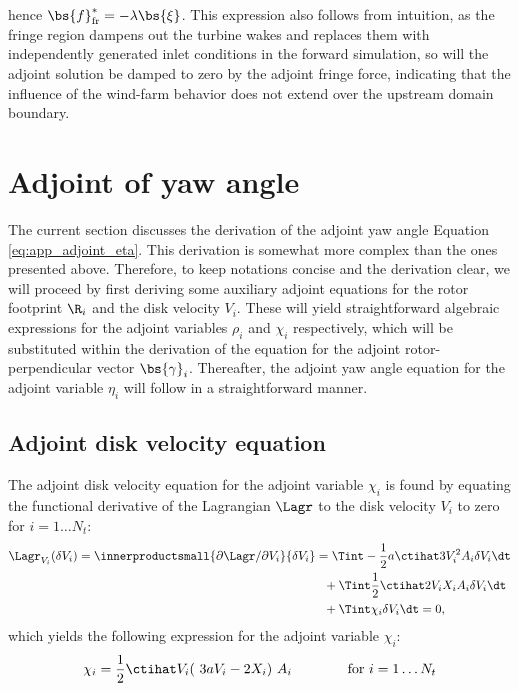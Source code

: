 hence $\bs{f}_{\text{fr}}^* = -\lambda \bs{\xi}$. This expression also follows from intuition, as the fringe region dampens out the turbine wakes and replaces them with independently generated inlet conditions in the forward simulation, so will the adjoint solution be damped to zero by the adjoint fringe force, indicating that the influence of the wind-farm behavior does not extend over the upstream domain boundary. 

\section{Adjoint of yaw angle}
The current section discusses the derivation of the adjoint yaw angle Equation \eqref{eq:app_adjoint_eta}. This derivation is somewhat more complex than the ones presented above. Therefore, to keep notations concise and the derivation clear, we will proceed by first deriving some auxiliary adjoint equations for the rotor footprint $\R_i$ and the disk velocity $V_i$. These will yield straightforward algebraic expressions for the adjoint variables $\rho_i$ and $\chi_i$ respectively, which will be substituted within the derivation of the equation for the adjoint rotor-perpendicular vector $\bs{\gamma}_i$. Thereafter, the adjoint yaw angle equation for the adjoint variable $\eta_i$ will follow in a straightforward manner.



\subsection{Adjoint disk velocity equation}
The adjoint disk velocity equation for the adjoint variable $\chi_i$ is found by equating the functional derivative of the Lagrangian $\Lagr$ to the disk velocity $V_i$ to zero for $i = 1 \dots N_t$: 
\begin{align}
\Lagr_{V_i}(\delta V_i) = \innerproductsmall{\partial \Lagr / \partial V_i}{\delta V_i} &= \Tint -\frac{1}{2} a \ctihat 3 V_i^2 A_i \delta V_i \dt  \nonumber \\
& \ \ + \Tint \frac{1}{2} \ctihat 2 V_i X_i  A_i \delta V_i \dt \nonumber \\
& \ \ + \Tint \chi_i \delta V_i \dt = 0, 
\end{align}
which yields the following expression for the adjoint variable $\chi_i$:
\begin{equation}\label{eq:chi_i}
\chi_i = \frac{1}{2} \ctihat V_i (~3a V_i - 2 X_i )~A_i \qquad\qquad \text{for } i=1\dots N_t 
\end{equation}

